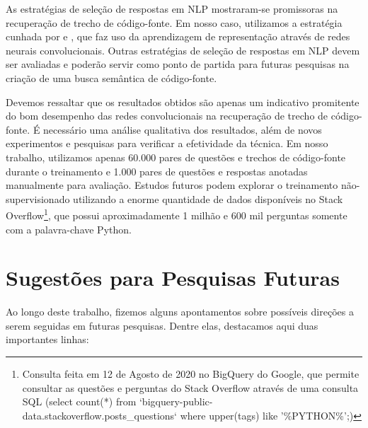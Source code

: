 As estratégias de seleção de respostas em NLP mostraram-se promissoras na recuperação de trecho de código-fonte. Em nosso caso, utilizamos a estratégia cunhada por \cite{feng-2015} e \cite{tan-lstm-qa}, que faz uso da aprendizagem de representação através de redes neurais convolucionais. Outras estratégias de seleção de respostas em NLP devem ser avaliadas e poderão servir como ponto de partida para futuras pesquisas na criação de uma busca semântica de código-fonte.

Devemos ressaltar que os resultados obtidos são apenas um indicativo promitente do bom desempenho das redes convolucionais na recuperação de trecho de código-fonte. É necessário uma análise qualitativa dos resultados, além de novos experimentos e pesquisas para verificar a efetividade da técnica. Em nosso trabalho, utilizamos apenas 60.000 pares de questões e trechos de código-fonte durante o treinamento e 1.000 pares de questões e respostas anotadas manualmente para avaliação. Estudos futuros podem explorar o treinamento não-supervisionado utilizando a enorme quantidade de dados disponíveis no Stack Overflow\footnote{Consulta feita em 12 de Agosto de 2020 no BigQuery do Google, que permite consultar as questões e perguntas do Stack Overflow através de uma consulta SQL (select count(*) from `bigquery-public-data.stackoverflow.posts\_questions` where upper(tags) like '\%PYTHON\%';)}, que possui aproximadamente 1 milhão e 600 mil perguntas somente com a palavra-chave Python.



\section{Sugestões para Pesquisas Futuras} 

Ao longo deste trabalho, fizemos alguns apontamentos sobre possíveis direções a serem seguidas em futuras pesquisas. Dentre elas, destacamos aqui duas importantes linhas:

